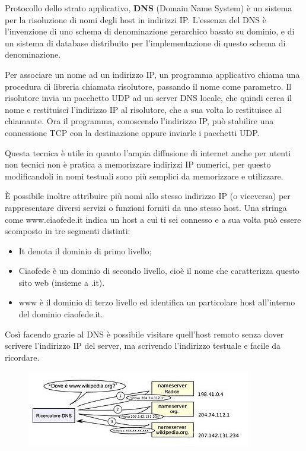 Protocollo dello strato applicativo, \textbf{DNS} (Domain Name System) è un sistema per la risoluzione di nomi degli host in indirizzi IP. 
L’essenza del DNS è l’invenzione di uno schema di denominazione gerarchico basato su dominio, e di un sistema di database distribuito per l’implementazione di questo schema di denominazione.

Per associare un nome ad un indirizzo IP, un programma applicativo chiama una procedura di libreria chiamata risolutore, passando il nome come parametro. Il risolutore invia un pacchetto UDP ad un server DNS locale, che quindi cerca il nome e restituisci l’indirizzo IP al risolutore, che a sua volta lo restituisce al chiamante. Ora il programma, conoscendo l’indirizzo IP, può stabilire una connessione TCP con la destinazione oppure inviarle i pacchetti UDP.

Questa tecnica è utile in quanto l’ampia diffusione di internet anche per utenti non tecnici non è pratica a memorizzare indirizzi IP numerici, per questo modificandoli in nomi testuali sono più semplici da memorizzare e utilizzare.

È possibile inoltre attribuire più nomi allo stesso indirizzo IP (o viceversa) per rappresentare diversi servizi o funzioni forniti da uno stesso host.
Una stringa come www.ciaofede.it indica un host a cui ti sei connesso e a sua volta può essere scomposto in tre segmenti distinti:
\begin{itemize}
\item	It denota il dominio di primo livello;
\item	Ciaofede è un dominio di secondo livello, cioè il nome che caratterizza questo sito web (insieme a .it).
\item	www è il dominio di terzo livello ed identifica un particolare host all’interno del dominio ciaofede.it.
\end{itemize}
Così facendo grazie al DNS è possibile visitare quell’host remoto senza dover scrivere l’indirizzo IP del server, ma scrivendo l’indirizzo testuale e facile da ricordare.

\begin{figure}[H]
\centering
\includegraphics[scale=0.6]{res/img/50_DNS.png}
\end{figure}
